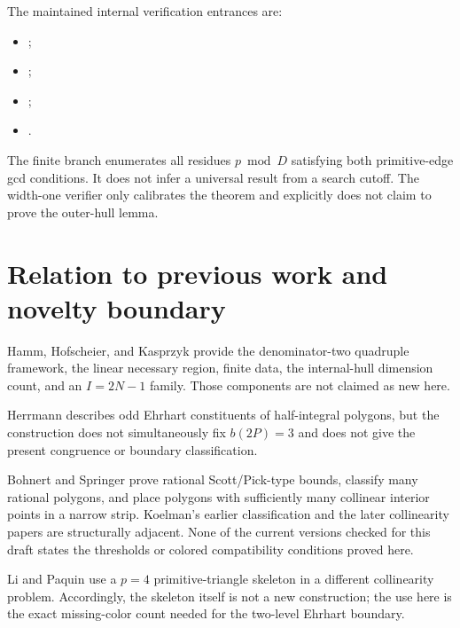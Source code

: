 \documentclass[11pt]{article}
\theoremstyle{remark}
\numberwithin{equation}{section}
\begin{document}
The maintained internal verification entrances are:

\begin{itemize}
\item \href{../../../loops/EHRHART-D2-MOD8-0001/verify_mod8_obstruction.py}{\texttt{}};
\item \href{../../../loops/EHRHART-D2-CLASSIFY-0002/verify_near_lower_gap.py}{\texttt{}};
\item \href{../../../loops/EHRHART-D2-CLASSIFY-0002/verify_next_boundary_reduction.py}{\texttt{}};
\item \href{../../../loops/EHRHART-D2-WIDTH1-0003/verify_width_one_shell_gate.py}{\texttt{}}.
\end{itemize}

The finite branch enumerates all residues $p\bmod D$ satisfying both primitive-edge gcd conditions. It does not infer a universal result from a search cutoff. The width-one verifier only calibrates the theorem and explicitly does not claim to prove the outer-hull lemma.

\section{Relation to previous work and novelty boundary}


Hamm, Hofscheier, and Kasprzyk \cite{ref2} provide the denominator-two quadruple framework, the linear necessary region, finite data, the internal-hull dimension count, and an $I=2N-1$ family. Those components are not claimed as new here.

Herrmann \cite{ref1} describes odd Ehrhart constituents of half-integral polygons, but the construction does not simultaneously fix $b(2P)=3$ and does not give the present congruence or boundary classification.

Bohnert and Springer \cite{ref3,ref4} prove rational Scott/Pick-type bounds, classify many rational polygons, and place polygons with sufficiently many collinear interior points in a narrow strip. Koelman's earlier classification and the later collinearity papers \cite{ref7,ref8,ref12} are structurally adjacent. None of the current versions checked for this draft states the thresholds or colored compatibility conditions proved here.

Li and Paquin \cite{ref7} use a $p=4$ primitive-triangle skeleton in a different collinearity problem. Accordingly, the skeleton itself is not a new construction; the use here is the exact missing-color count needed for the two-level Ehrhart boundary.
\end{document}
